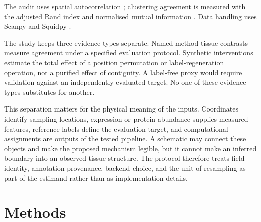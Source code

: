 \documentclass[journal]{IEEEtran}
\begin{document}
The audit uses spatial autocorrelation \citep{moran1950}; clustering agreement is measured
with the adjusted Rand index \citep{hubert1985ari} and normalised mutual information \citep{strehl2002nmi}.
Data handling uses Scanpy \citep{wolf2018scanpy} and Squidpy \citep{palla2022squidpy}.


The study keeps three evidence types separate. Named-method tissue contrasts measure agreement under a specified evaluation protocol. Synthetic interventions estimate the total effect of a position permutation or label-regeneration operation, not a purified effect of contiguity. A label-free proxy would require validation against an independently evaluated target. No one of these evidence types substitutes for another.

This separation matters for the physical meaning of the inputs. Coordinates identify sampling locations, expression or protein abundance supplies measured features, reference labels define the evaluation target, and computational assignments are outputs of the tested pipeline. A schematic may connect these objects and make the proposed mechanism legible, but it cannot make an inferred boundary into an observed tissue structure. The protocol therefore treats field identity, annotation provenance, backend choice, and the unit of resampling as part of the estimand rather than as implementation details.

\section{Methods}
\end{document}
